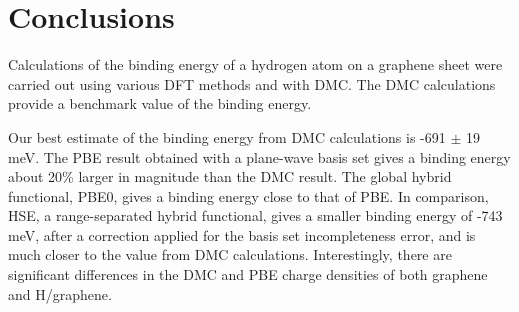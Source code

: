 \section{Conclusions}
Calculations of the binding energy of a hydrogen atom on a graphene sheet were carried out using various DFT methods and with DMC.
The DMC calculations provide a benchmark value of the binding energy.

Our best estimate of the binding energy from DMC calculations is -691 $\pm$ 19 meV.
The PBE result obtained with a plane-wave basis set gives a binding energy about 20\% larger in magnitude than the DMC result.
The global hybrid functional, PBE0, gives a binding energy close to that of PBE.
In comparison, HSE, a range-separated hybrid functional, gives a smaller binding energy of -743 meV, after a correction applied for the basis set incompleteness error, and is much closer to the value from DMC calculations.
Interestingly, there are significant differences in the DMC and PBE charge densities of both graphene and H/graphene.
